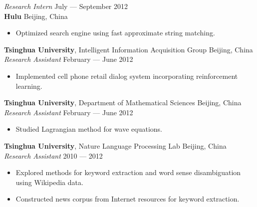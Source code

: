 \documentclass[a4paper,9pt]{extarticle} %
\begin{document}

\textit{Research Intern} \hfill July --- September 2012 \\
\textbf{Hulu} \hfill Beijing, China \\
\vspace{-1.5\parskip}

\begin{itemize}[nosep]
  \item Optimized search engine using fast approximate string matching.
\end{itemize}


\textbf{Tsinghua University}, Intelligent Information Acquisition Group \hfill Beijing, China \\
\textit{Research Assistant} \hfill February --- June 2012
\vspace{-\parskip}
\begin{itemize}
  \item Implemented cell phone retail dialog system incorporating reinforcement learning.
\end{itemize}


\textbf{Tsinghua University}, Department of Mathematical Sciences \hfill Beijing, China \\
\textit{Research Assistant} \hfill February --- June 2012
\vspace{-\parskip}
\begin{itemize}
  \item Studied Lagrangian method for wave equations.
\end{itemize}


\textbf{Tsinghua University}, Nature Language Processing Lab \hfill Beijing, China \\
\textit{Research Assistant} \hfill 2010 --- 2012
\vspace{-\parskip}
\begin{itemize}
  \item Explored methods for keyword extraction and word sense disambiguation using Wikipedia data.
  \item Constructed news corpus from Internet resources for keyword extraction.
\end{itemize}

\fi
\end{document}

